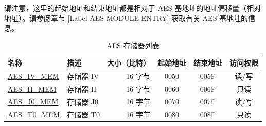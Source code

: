 请注意，这里的起始地址和结束地址都是相对于 AES 基地址的地址偏移量（相对地址）。请参阅章节 \ref{Label AES MODULE ENTRY} 获取有关 AES 基地址的信息。


\begin{longtable}{ |p{3cm} | p{3cm} | r | c | c | c |  }
\caption{AES 存储器列表} \label{table:AES-Memory-Blocks}
\\\hline
\rowcolor{lightgray}
名称 & 描述  &  大小（比特）  &  起始地址  &  结束地址  & 访问权限   \\ \hline
{\hyperref[memdesc:AESIVMEM]{AES\_IV\_MEM}} & 存储器 IV & 16 字节  & \hexprefix{}0050 & \hexprefix{}005F & 读/写 \\ \hline
{\hyperref[memdesc:AESHMEM]{AES\_H\_MEM}}  & 存储器 H  & 16 字节  & \hexprefix{}0060 & \hexprefix{}006F & 只读  \\ \hline
{\hyperref[memdesc:AESJ0MEM]{AES\_J0\_MEM}} & 存储器 J0 & 16 字节  & \hexprefix{}0070 & \hexprefix{}007F & 读/写 \\ \hline
{\hyperref[memdesc:AEST0MEM]{AES\_T0\_MEM}} & 存储器 T0 & 16 字节  & \hexprefix{}0080 & \hexprefix{}008F & 只读  \\ \hline

\end{longtable}
